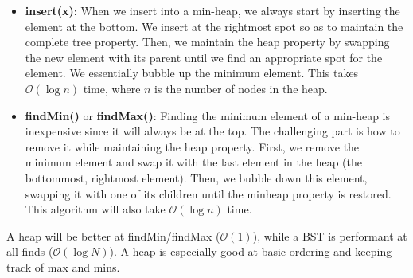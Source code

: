 \documentclass{article}
\newcommand{\bigO}{\ensuremath{\mathcal{O}}}
\begin{document}
    \begin{itemize}
        \item \textbf{insert(x)}: When we insert into a min-heap, we always start by inserting the element at the bottom. We insert at the rightmost spot so as to maintain the complete tree property. Then, we maintain the heap property by swapping the new element with its parent until we find an appropriate spot for the element. We essentially bubble up the minimum element. This takes $\bigO (\log n)$ time, where $n$ is the number of nodes in the heap. 
        
        \item \textbf{findMin()} or \textbf{findMax()}: Finding the minimum element of a min-heap is inexpensive since it will always be at the top. The challenging part is how to remove it while maintaining the heap property. First, we remove the minimum element and swap it with the last element in the heap (the bottommost, rightmost element). Then, we bubble down this element, swapping it with one of its children until the minheap property is restored. This algorithm will also take $\bigO( \log n)$ time. 
    \end{itemize}
    
    A heap will be better at findMin/findMax ($\bigO(1)$), while a BST is performant at all finds ($\bigO(\log N)$). A heap is especially good at basic ordering and keeping track of max and mins.
\end{document}
